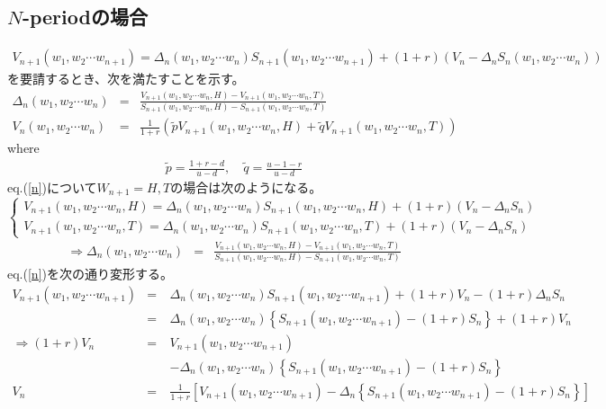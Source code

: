 \documentclass[10pt]{article}
\theoremstyle{plain}
\begin{document}
\subsection{$N$-periodの場合}
\begin{eqnarray}
V_{n+1}(w_1,w_2\cdots w_{n+1})=\Delta_{n}(w_1,w_2\cdots w_n)S_{n+1}(w_1,w_2\cdots w_{n+1})+(1+r)(V_{n}-\Delta_{n}S_n(w_1,w_2\cdots w_n)) \label{n}
\end{eqnarray}
を要請するとき、次を満たすことを示す。
\begin{eqnarray}
\Delta_n(w_1,w_2\cdots w_n) &=& \frac{V_{n+1}(w_1,w_2\cdots w_n,H)-V_{n+1}(w_1,w_2\cdots w_n,T)}{S_{n+1}(w_1,w_2\cdots w_n,H)- S_{n+1}(w_1,w_2\cdots w_n,T)}\\
V_n(w_1,w_2\cdots w_n)&=& \frac{1}{1+r}\left(\tilde{p}V_{n+1}(w_1,w_2\cdots w_n,H) + \tilde{q}V_{n+1}(w_1,w_2\cdots w_n,T) \right)
\end{eqnarray}
where
\begin{eqnarray}
\tilde{p}=\frac{1+r-d}{u-d},\quad  \tilde{q}=\frac{u-1-r}{u-d}
\end{eqnarray}
eq.(\ref{n})について$W_{n+1}=H,T$の場合は次のようになる。
\begin{displaymath}
\left\{
\begin{array}{l}
V_{n+1}(w_1,w_2\cdots w_n,H)=\Delta_{n}(w_1,w_2\cdots w_n)S_{n+1}(w_1,w_2\cdots w_n,H)+(1+r)(V_{n}-\Delta_{n}S_n) \\
V_{n+1}(w_1,w_2\cdots w_n,T)=\Delta_{n}(w_1,w_2\cdots w_n)S_{n+1}(w_1,w_2\cdots w_n,T)+(1+r)(V_{n}-\Delta_{n}S_n)
\end{array}
\right.
\end{displaymath}
\begin{eqnarray}
\Rightarrow \Delta_n(w_1,w_2\cdots w_n) &=& \frac{V_{n+1}(w_1,w_2\cdots w_n,H)-V_{n+1}(w_1,w_2\cdots w_n,T)}{S_{n+1}(w_1,w_2\cdots w_n,H)- S_{n+1}(w_1,w_2\cdots w_n,T)}  \label{deltan}
\end{eqnarray}
eq.(\ref{n})を次の通り変形する。
\begin{eqnarray}
V_{n+1}(w_1,w_2\cdots w_{n+1})
&=&\Delta_{n}(w_1,w_2\cdots w_n)S_{n+1}(w_1,w_2\cdots w_{n+1})+(1+r)V_{n}-(1+r)\Delta_{n}S_n \\
&=&\Delta_{n}(w_1,w_2\cdots w_n)\left\{S_{n+1}(w_1,w_2\cdots w_{n+1})-(1+r)S_n\right\}+(1+r)V_{n} \\
\Rightarrow (1+r)V_{n} &=& V_{n+1}(w_1,w_2\cdots w_{n+1}) \\
&\quad& - \Delta_{n}(w_1,w_2\cdots w_n)\left\{S_{n+1}(w_1,w_2\cdots w_{n+1})-(1+r)S_n\right\}\\
V_{n} &=& \frac{1}{1+r}\left[V_{n+1}(w_1,w_2\cdots w_{n+1})- \Delta_{n}\left\{S_{n+1}(w_1,w_2\cdots w_{n+1})-(1+r)S_n\right\}\right]
\end{eqnarray}
\end{document}
